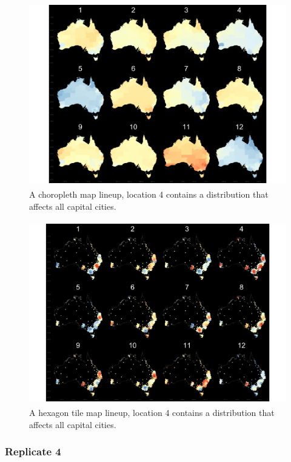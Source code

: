 \documentclass{monashthesis}
\begin{document}
\begin{figure}[H]
\centering
\includegraphics[height=8cm]{lineups/cities-geo4-1.pdf}
\caption{\label{fig:cities-geo4}A choropleth map lineup, location 4 contains a distribution that affects all capital cities.}
\end{figure}

\begin{figure}[H]
\centering
\includegraphics[height=8cm]{lineups/cities-hex4-1.pdf}
\caption{\label{fig:cities-hex4}A hexagon tile map lineup, location 4 contains a distribution that affects all capital cities.}
\end{figure}

\hypertarget{replicate-4}{%
\subsubsection{Replicate 4}\label{replicate-4}}
\end{document}
